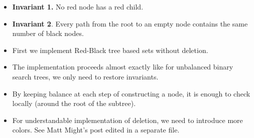 \documentclass{beamer}
\newcommand{\tmstrong}[1]{\textbf{#1}}
\begin{document}
\begin{itemize}
  \item {\tmstrong{Invariant 1.}} No red node has a red child.
  
  \item {\tmstrong{Invariant 2}}. Every path from the root to an empty node
  contains the same number of black nodes.
  
  \item First we implement Red-Black tree based sets without deletion.
  
  \item The implementation proceeds almost exactly like for unbalanced binary
  search trees, we only need to restore invariants.
  
  \item By keeping balance at each step of constructing a node, it is enough
  to check locally (around the root of the subtree).
  
  \item For understandable implementation of deletion, we need to introduce
  more colors. See Matt Might's post edited in a separate file.
\end{itemize}
\end{document}
